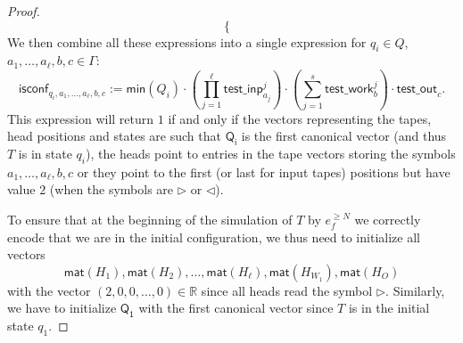 \begin{proof}
$$\begin{cases}
    \end{cases}
    $$
    We then combine all these expressions into a single expression for $q_i\in Q$, 
    $a_1,\ldots,a_\ell,b,c\in\Gamma$:
    $$
    \mathsf{isconf}_{q_i,a_1,\ldots,a_\ell,b,c}:=
    \mathsf{min}(Q_i)\cdot \left(\prod_{j=1}^{\ell} \mathsf{test\_inp}_{a_j}^j\right)
    \cdot\left(\sum_{j=1}^s \mathsf{test\_work}_b^j\right)\cdot \mathsf{test\_out}_{c}.
    $$
    This expression will return $1$ if and only if the vectors representing the tapes, 
    head positions and states are such that $\mathsf{Q_i}$ is the first canonical vector 
    (and thus $T$ is in state $q_i$), the heads point to entries in the tape vectors storing 
    the symbols $a_1,\ldots,a_{\ell}, b,c$ or they point to the first (or last for input tapes) 
    positions but have value $2$ (when the symbols are $\rhd$ or $\lhd$). 

    To ensure that at the beginning of the simulation of $T$ by $e_f^{\geq N}$ we correctly encode 
    that we are in the initial configuration, we thus need to initialize all vectors 
    $$\mathsf{mat}(H_1),\mathsf{mat}(H_2),\ldots, \mathsf{mat}(H_\ell), \mathsf{mat}(H_{W_1}),\mathsf{mat}(H_O)$$
    with the vector $(2,0,0,\ldots,0)\in\mathbb{R}$ since all heads read the symbol $\rhd$. Similarly, 
    we have to initialize $\mathsf{Q_1}$ with the first canonical vector since $T$ is in the initial state $q_1$.


\end{proof}
